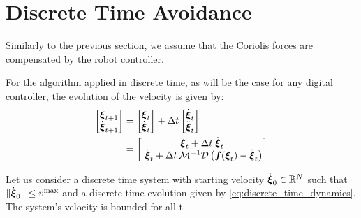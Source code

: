 \section{Discrete Time Avoidance}
Similarly to the previous section, we assume that the Coriolis forces are compensated by the robot controller.

For the algorithm applied in discrete time, as will be the case for any digital controller, the evolution of the velocity is given by:
\begin{equation}
	\begin{split}
	\begin{bmatrix}
	 \vecs \xi_{t+1} \\ \dot{\vecs \xi}_{t+1}
	\end{bmatrix}
	& =
	\begin{bmatrix}
	 \vecs \xi_{t} \\ \dot{\vecs \xi}_{t}
	\end{bmatrix}
	+ 
	\Delta t 
	\begin{bmatrix}
		\dot{\vecs \xi}_{t} \\ \ddot{\vecs \xi}_t 
	\end{bmatrix} \\
	& =
	\begin{bmatrix}
		\vect \xi_t + \Delta t  \; \dot{\vect \xi}_t \\ \
		\dot{\vecs \xi}_t + \Delta t \, \matd{M}^{-1} \matd{D} \left( \vect f(\vecs \xi_t) - \dot{\vecs \xi}_t \right)
	\end{bmatrix} 
	\label{eq:discrete_time_dynamics}
	\end{split}
\end{equation}

\begin{lemma}
	Let us consider a discrete time system with starting velocity $\dot{\boldsymbol{\xi}}_0 \in \mathbb{R}^N$ such that $\| \dot{\boldsymbol{\xi}}_0\| \leq v^{\mathrm{max}}$ and a discrete time evolution given by \eqref{eq:discrete_time_dynamics}. The system's velocity is bounded for all t 
\end{lemma}

